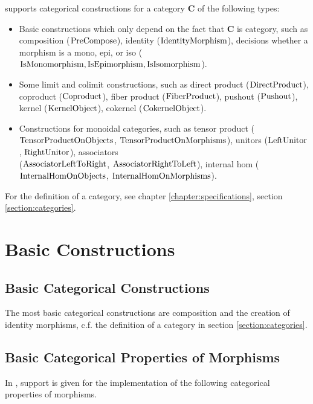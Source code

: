 \CapPkg supports categorical constructions 
for a category $\mathbf{C}$
of the following types:

\begin{itemize}
 \item Basic constructions which only depend on the fact that $\mathbf{C}$ is category,
 such as composition ($\mathrm{PreCompose}$), identity ($\mathrm{IdentityMorphism}$), decisions whether
 a morphism is a mono, epi, or iso ($\mathrm{IsMonomorphism}, \mathrm{IsEpimorphism}, \mathrm{IsIsomorphism}$).
 \item Some limit and colimit constructions, such as direct product ($\mathrm{DirectProduct}$),
 coproduct ($\mathrm{Coproduct}$), fiber product ($\mathrm{FiberProduct}$), pushout ($\mathrm{Pushout}$),
 kernel ($\mathrm{KernelObject}$), cokernel ($\mathrm{CokernelObject}$).
 \item Constructions for monoidal categories, such as tensor product ($\mathrm{TensorProductOnObjects}$, $\mathrm{TensorProductOnMorphisms}$),
 unitors ($\mathrm{LeftUnitor}$, $\mathrm{RightUnitor}$), associators \\($\mathrm{AssociatorLeftToRight}$, $\mathrm{AssociatorRightToLeft}$),
 internal hom ($\mathrm{InternalHomOnObjects}$, $\mathrm{InternalHomOnMorphisms}$).
\end{itemize}

\begin{notation}
 For the definition of a category, see chapter \ref{chapter:specifications}, section \ref{section:categories}.
\end{notation}


\section{Basic Constructions}

\subsection{Basic Categorical Constructions}

The most basic categorical constructions are composition and the creation
of identity morphisms, c.f. the definition of a \CapPkg category in section \ref{section:categories}.

\subsection{Basic Categorical Properties of Morphisms}

In \CapPkg, support is given for the implementation of the following categorical properties
of morphisms.


